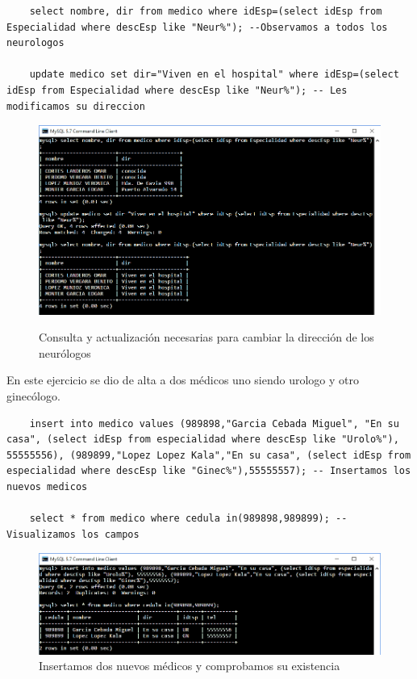 \documentclass[12pt, titlepage]{article}
\begin{document}
	\begin{lstlisting}
	select nombre, dir from medico where idEsp=(select idEsp from Especialidad where descEsp like "Neur%"); --Observamos a todos los neurologos
	
	update medico set dir="Viven en el hospital" where idEsp=(select idEsp from Especialidad where descEsp like "Neur%"); -- Les modificamos su direccion
	\end{lstlisting}
	\begin{figure}[H]
		\begin{center}
			\includegraphics[width=\textwidth]{img/17.png}
			\label{fig:17}
			\caption{Consulta y actualización necesarias para cambiar la dirección de los neurólogos}
		\end{center}
	\end{figure}
	En este ejercicio se dio de alta a dos médicos uno siendo urologo y otro ginecólogo.
	\begin{lstlisting}
	insert into medico values (989898,"Garcia Cebada Miguel", "En su casa", (select idEsp from especialidad where descEsp like "Urolo%"), 55555556), (989899,"Lopez Lopez Kala","En su casa", (select idEsp from especialidad where descEsp like "Ginec%"),55555557); -- Insertamos los nuevos medicos
	
	select * from medico where cedula in(989898,989899); --Visualizamos los campos
	\end{lstlisting}
	\begin{figure}[H]
		\begin{center}
			\includegraphics[width=\textwidth]{img/18.png}
			\caption{Insertamos dos nuevos médicos y comprobamos su existencia}
			\label{fig:18}
		\end{center}
	\end{figure}
\end{document}
